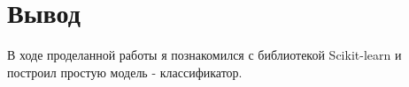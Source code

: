 \chapter{Вывод}
\label{ch:chap3}

В ходе проделанной работы я познакомился с библиотекой Scikit-learn и построил простую модель - классификатор.





\endinput
